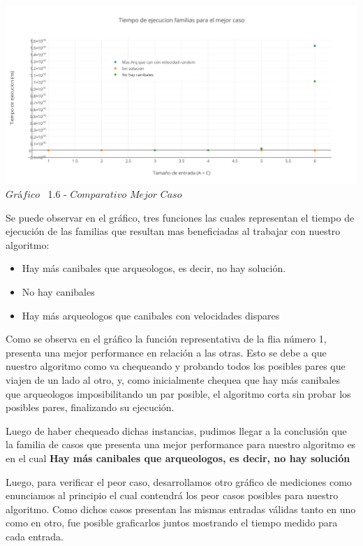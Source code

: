    \vspace*{0.3cm} \vspace*{0.3cm}
  \begin{center}
 \includegraphics[scale=0.65]{./EJ1/comparativomejorcaso.png}
 {$Gr$\'a$fico$ \ 1.6 - $Comparativo$ $Mejor$ $Caso$}
  \end{center}
  \vspace*{0.3cm}

Se puede observar en el gr\'afico, tres funciones las cuales representan el tiempo de ejecuci\'on de las familias que resultan mas beneficiadas al trabajar con nuestro algoritmo:\\
\begin{itemize}
\item Hay m\'as canibales que arqueologos, es decir, no hay soluci\'on.
\item No hay canibales
\item Hay m\'as arqueologos que canibales con velocidades dispares
\end{itemize}

Como se observa en el gr\'afico la funci\'on representativa de la flia n\'umero 1, presenta una mejor performance en relaci\'on a las otras. Esto se debe a que nuestro algoritmo como  va chequeando y probando todos los posibles pares que viajen de un lado al otro, y, como inicialmente chequea que hay m\'as canibales que arqueologos imposibilitando un par posible, el algoritmo corta sin probar los posibles pares, finalizando su ejecuci\'on.

Luego de haber chequeado dichas instancias, pudimos llegar a la conclusi\'on que la familia de casos que presenta una mejor performance para nuestro algoritmo
es en el cual \textbf{Hay m\'as canibales que arqueologos, es decir, no hay soluci\'on}

Luego, para verificar el peor caso, desarrollamos otro gr\'afico de mediciones como enunciamos al principio el cual contendr\'a los peor casos posibles para nuestro algoritmo. Como dichos casos presentan las mismas entradas v\'alidas tanto en uno como en otro, fue posible graficarlos juntos mostrando el tiempo medido para cada entrada.\\

